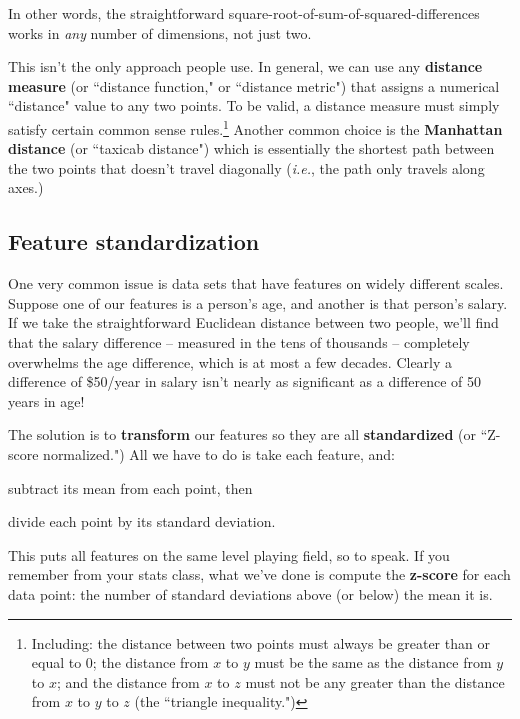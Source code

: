 \documentclass[12pt]{article}
\begin{document}
In other words, the straightforward square-root-of-sum-of-squared-differences
works in \textit{any} number of dimensions, not just two.

This isn't the only approach people use. In general, we can use any
\textbf{distance measure} (or ``distance function," or ``distance metric")
that assigns a numerical ``distance" value to any two points. To be valid, a
distance measure must simply satisfy certain common sense
rules.\footnote{Including: the distance between two points must always be
greater than or equal to 0; the distance from $x$ to $y$ must be the same as
the distance from $y$ to $x$; and the distance from $x$ to $z$ must not be any
greater than the distance from $x$ to $y$ to $z$ (the ``triangle
inequality.")} Another common choice is the \textbf{Manhattan distance} (or
``taxicab distance") which is essentially the shortest path between the two
points that doesn't travel diagonally (\textit{i.e.}, the path only travels
along axes.)

\subsection{Feature standardization}

One very common issue is data sets that have features on widely different
scales. Suppose one of our features is a person's age, and another is that
person's salary. If we take the straightforward Euclidean distance between two
people, we'll find that the salary difference -- measured in the tens of
thousands -- completely overwhelms the age difference, which is at most a few
decades. Clearly a difference of \$50/year in salary isn't nearly as
significant as a difference of 50 years in age!

The solution is to \textbf{transform} our features so they are all
\textbf{standardized} (or ``Z-score normalized.") All we have to do is take
each feature, and:

\begin{compactenum}
\item subtract its mean from each point, then
\item divide each point by its standard deviation.
\end{compactenum}

This puts all features on the same level playing field, so to speak. If you
remember from your stats class, what we've done is compute the
\textbf{z-score} for each data point: the number of standard deviations above
(or below) the mean it is.
\end{document}
